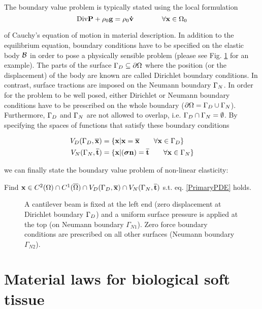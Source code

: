 The boundary value problem is typically stated using the local formulation 
\begin{equation}
  \textnormal{Div} \mathbf {P}   +    \rho _0 \mathbf {g}  =  \rho _0 \mathbf {\dot v}  \qquad \qquad \forall \mathbf {x}  \in \Omega_0\\
\label{PrimaryPDE}
\end{equation} 

of Cauchy's equation of motion in material description. In addition to the equilibrium equation, boundary conditions have to be specified on the elastic body $\mathcal{B} $ in order to pose a physically sensible problem (please see Fig. \ref{CantileverBeamBVP} for an example). The parts of the surface $\Gamma _D \subseteq \partial \Omega$ where the position (or the displacement) of the body are known are called Dirichlet boundary conditions. In contrast, surface tractions are imposed on the Neumann boundary $\Gamma _N$. In order for the problem to be well posed, either Dirichlet or Neumann boundary conditions have to be prescribed on the whole boundary ($\partial \Omega = \Gamma _D \cup \Gamma _N$). Furthermore, $\Gamma _D$ and $\Gamma _N$ are not allowed to overlap, i.e. $\Gamma _D \cap \Gamma _N = \emptyset$. By specifying the spaces of functions that satisfy these boundary conditions

\begin{alignat}{1}
V_D(\Gamma _D,\overline{\mathbf {x} }) &= \{ \mathbf {x}  | \mathbf {x}  = \overline{\mathbf {x} }  \qquad \forall \mathbf {x}  \in  \Gamma _D \}\\ 
V_N(\Gamma _N,\overline{\mathbf {t} }) &= \{ \mathbf {x}  | (\boldsymbol{\sigma} \mathbf {n} ) = \overline{\mathbf {t} }  \qquad \forall \mathbf {x}  \in  \Gamma _N \}
\end{alignat}

we can finally state the boundary value problem of non-linear elasticity: 

Find $\mathbf {x}  \in {C} ^{2}(\Omega) \cap {C} ^{1} (\overline{\Omega}) \cap V_D(\Gamma _D,\overline{\mathbf {x} }) \cap V_N(\Gamma _N,\overline{\mathbf {t} }) $ s.t. eq. \ref{PrimaryPDE} holds.

\begin{figure}
   \centering   
	\caption{A cantilever beam is fixed at the left end (zero displacement at Dirichlet boundary $\Gamma _D$) and a uniform surface pressure is applied at the top (on Neumann boundary $\Gamma _{N1}$). Zero force boundary conditions are prescribed on all other surfaces (Neumann boundary $\Gamma _{N2}$).}
\label{CantileverBeamBVP}
\end{figure}

\section{Material laws for biological soft tissue}
\label{MaterialLawsForBiologicalSoftTissue}


